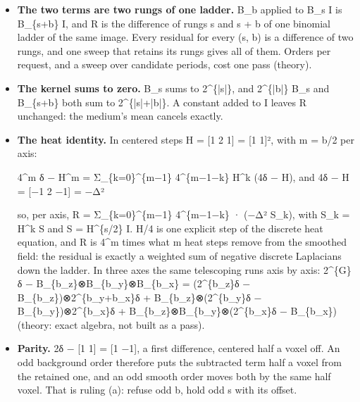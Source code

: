 \begin{itemize}
\item \textbf{The two terms are two rungs of one ladder.} B\_\allowbreak{}b applied to B\_\allowbreak{}s I is B\_\allowbreak{}\{s+b\} I, and R is the difference of rungs s and s + b of one binomial ladder of the same image. Every residual for every (s, b) is a difference of two rungs, and one sweep that retains its rungs gives all of them. Orders per request, and a sweep over candidate periods, cost one pass (theory).
\item \textbf{The kernel sums to zero.} B\_\allowbreak{}s sums to 2\textasciicircum{}\{|s|\}, and 2\textasciicircum{}\{|b|\} B\_\allowbreak{}s and B\_\allowbreak{}\{s+b\} both sum to 2\textasciicircum{}\{|s|+|b|\}. A constant added to I leaves R unchanged: the medium's mean cancels exactly.
\item \textbf{The heat identity.} In centered steps H = [1 2 1] = [1 1]², with m = b/2 per axis:

4\textasciicircum{}m δ − H\textasciicircum{}m = Σ\_\allowbreak{}\{k=0\}\textasciicircum{}\{m−1\} 4\textasciicircum{}\{m−1−k\} H\textasciicircum{}k (4δ − H),  and 4δ − H = [−1 2 −1] = −Δ²

so, per axis, R = Σ\_\allowbreak{}\{k=0\}\textasciicircum{}\{m−1\} 4\textasciicircum{}\{m−1−k\} · (−Δ² S\_\allowbreak{}k), with S\_\allowbreak{}k = H\textasciicircum{}k S and S = H\textasciicircum{}\{s/2\} I. H/4 is one explicit step of the discrete heat equation, and R is 4\textasciicircum{}m times what m heat steps remove from the smoothed field: the residual is exactly a weighted sum of negative discrete Laplacians down the ladder. In three axes the same telescoping runs axis by axis: 2\textasciicircum{}\{G\}δ − B\_\allowbreak{}\{b\_\allowbreak{}z\}⊗B\_\allowbreak{}\{b\_\allowbreak{}y\}⊗B\_\allowbreak{}\{b\_\allowbreak{}x\} = (2\textasciicircum{}\{b\_\allowbreak{}z\}δ − B\_\allowbreak{}\{b\_\allowbreak{}z\})⊗2\textasciicircum{}\{b\_\allowbreak{}y+b\_\allowbreak{}x\}δ + B\_\allowbreak{}\{b\_\allowbreak{}z\}⊗(2\textasciicircum{}\{b\_\allowbreak{}y\}δ − B\_\allowbreak{}\{b\_\allowbreak{}y\})⊗2\textasciicircum{}\{b\_\allowbreak{}x\}δ + B\_\allowbreak{}\{b\_\allowbreak{}z\}⊗B\_\allowbreak{}\{b\_\allowbreak{}y\}⊗(2\textasciicircum{}\{b\_\allowbreak{}x\}δ − B\_\allowbreak{}\{b\_\allowbreak{}x\}) (theory: exact algebra, not built as a pass).
\item \textbf{Parity.} 2δ − [1 1] = [1 −1], a first difference, centered half a voxel off. An odd background order therefore puts the subtracted term half a voxel from the retained one, and an odd smooth order moves both by the same half voxel. That is ruling (a): refuse odd b, hold odd s with its offset.
\end{itemize}

